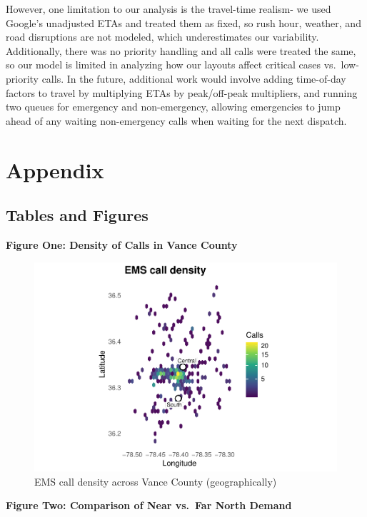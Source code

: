 \documentclass[
  11pt,
]{article}
\begin{document}
However, one limitation to our analysis is the travel-time realism- we
used Google's unadjusted ETAs and treated them as fixed, so rush hour,
weather, and road disruptions are not modeled, which underestimates our
variability. Additionally, there was no priority handling and all calls
were treated the same, so our model is limited in analyzing how our
layouts affect critical cases vs.~low-priority calls. In the future,
additional work would involve adding time-of-day factors to travel by
multiplying ETAs by peak/off-peak multipliers, and running two queues
for emergency and non-emergency, allowing emergencies to jump ahead of
any waiting non-emergency calls when waiting for the next dispatch.

\section{Appendix}\label{appendix}

\subsection{Tables and Figures}\label{tables-and-figures}

\textbf{Figure One: Density of Calls in Vance County}

\begin{figure}
\centering
\includegraphics{Report_files/figure-latex/eda1-1.pdf}
\caption{EMS call density across Vance County (geographically)}
\end{figure}

\newpage

\textbf{Figure Two: Comparison of Near vs.~Far North Demand}
\end{document}
